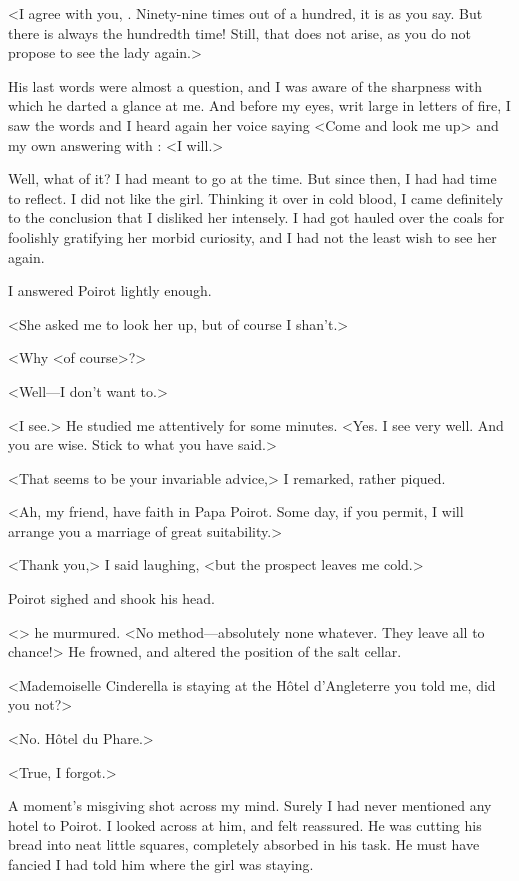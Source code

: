  <I agree with you, . Ninety-nine times out of a hundred, it is as you say. But there is always the hundredth time! Still, that does not arise, as you do not propose to see the lady again.> 

 His last words were almost a question, and I was aware of the sharpness with which he darted a glance at me. And before my eyes, writ large in letters of fire, I saw the words  and I heard again her voice saying <Come and look me up> and my own answering with : <I will.> 

 Well, what of it? I had meant to go at the time. But since then, I had had time to reflect. I did not like the girl. Thinking it over in cold blood, I came definitely to the conclusion that I disliked her intensely. I had got hauled over the coals for foolishly gratifying her morbid curiosity, and I had not the least wish to see her again. 

 I answered Poirot lightly enough. 

 <She asked me to look her up, but of course I shan't.> 

 <Why <of course>?> 

 <Well—I don't want to.> 

 <I see.> He studied me attentively for some minutes. <Yes. I see very well. And you are wise. Stick to what you have said.> 

 <That seems to be your invariable advice,> I remarked, rather piqued. 

 <Ah, my friend, have faith in Papa Poirot. Some day, if you permit, I will arrange you a marriage of great suitability.> 

 <Thank you,> I said laughing, <but the prospect leaves me cold.> 

 Poirot sighed and shook his head. 

 <> he murmured. <No method—absolutely none whatever. They leave all to chance!> He frowned, and altered the position of the salt cellar. 

 <Mademoiselle Cinderella is staying at the Hôtel d'Angleterre you told me, did you not?> 

 <No. Hôtel du Phare.> 

 <True, I forgot.> 

 A moment's misgiving shot across my mind. Surely I had never mentioned any hotel to Poirot. I looked across at him, and felt reassured. He was cutting his bread into neat little squares, completely absorbed in his task. He must have fancied I had told him where the girl was staying. 

